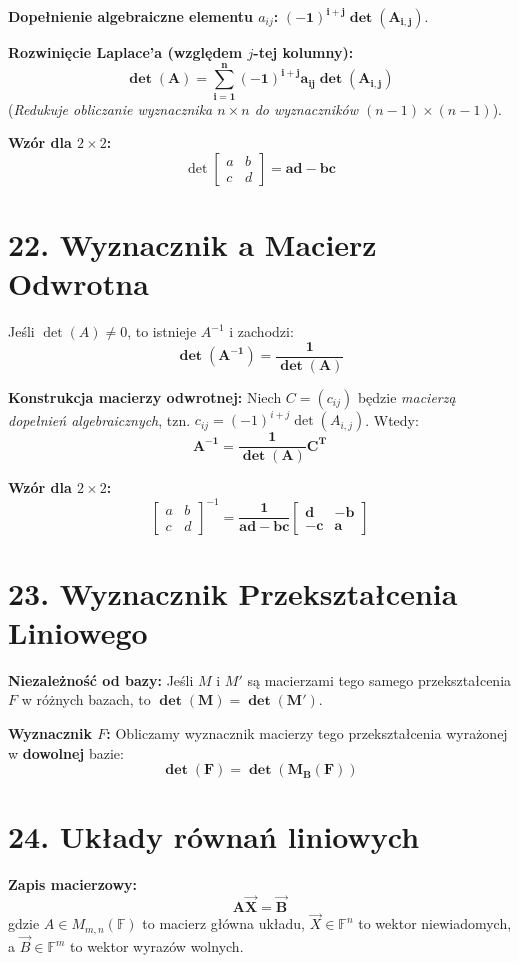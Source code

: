 \documentclass[12pt,a4paper]{article}
\begin{document}
\noindent\textbf{Dopełnienie algebraiczne elementu $a_{ij}$:} $\mathbf{(-1)^{i+j} \det(A_{i,j})}$. %

\noindent\textbf{Rozwinięcie Laplace'a (względem $j$-tej kolumny):} %
$$ \mathbf{\det(A) = \sum_{i=1}^n (-1)^{i+j} a_{ij} \det(A_{i,j})} $$
(\textit{Redukuje obliczanie wyznacznika $n \times n$ do wyznaczników $(n-1) \times (n-1)$}).

\noindent\textbf{Wzór dla $2 \times 2$:} %
$$ \det \begin{bmatrix} a & b \\ c & d \end{bmatrix} = \mathbf{ad - bc} $$

\section*{22. Wyznacznik a Macierz Odwrotna}
Jeśli $\det(A) \neq 0$, to istnieje $A^{-1}$ i zachodzi: %
$$ \mathbf{\det(A^{-1}) = \frac{1}{\det(A)}} $$

\noindent\textbf{Konstrukcja macierzy odwrotnej:} Niech $C = (c_{ij})$ będzie \textit{macierzą dopełnień algebraicznych}, tzn. $c_{ij} = (-1)^{i+j} \det(A_{i,j})$. Wtedy: %
$$ \mathbf{A^{-1} = \frac{1}{\det(A)} C^T} $$

\noindent\textbf{Wzór dla $2 \times 2$:} %
$$ \begin{bmatrix} a & b \\ c & d \end{bmatrix}^{-1} = \mathbf{\frac{1}{ad - bc} \begin{bmatrix} d & -b \\ -c & a \end{bmatrix}} $$

\section*{23. Wyznacznik Przekształcenia Liniowego}
\noindent\textbf{Niezależność od bazy:} Jeśli $M$ i $M'$ są macierzami tego samego przekształcenia $F$ w różnych bazach, to $\mathbf{\det(M) = \det(M')}$. %

\noindent\textbf{Wyznacznik $F$:} Obliczamy wyznacznik macierzy tego przekształcenia wyrażonej w \textbf{dowolnej} bazie: %
$$ \mathbf{\det(F) = \det(M_B(F))} $$

\section*{24. Układy równań liniowych}
\noindent\textbf{Zapis macierzowy:}
$$ \mathbf{A\vec{X} = \vec{B}} $$
gdzie $A \in M_{m,n}(\mathbb{F})$ to macierz główna układu, $\vec{X} \in \mathbb{F}^n$ to wektor niewiadomych, a $\vec{B} \in \mathbb{F}^m$ to wektor wyrazów wolnych. %
\end{document}
